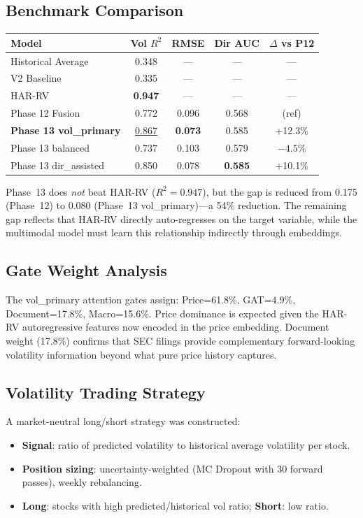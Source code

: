 \documentclass[12pt,a4paper]{article}
\begin{document}
\subsection{Benchmark Comparison}

\begin{center}
\begin{tabular}{lcccc}
\toprule
\textbf{Model} & \textbf{Vol $R^2$} & \textbf{RMSE} & \textbf{Dir AUC} & \textbf{$\Delta$ vs P12} \\
\midrule
Historical Average & 0.348 & --- & --- & --- \\
V2 Baseline        & 0.335 & --- & --- & --- \\
HAR-RV             & \textbf{0.947} & --- & --- & --- \\
Phase 12 Fusion    & 0.772 & 0.096 & 0.568 & (ref) \\
\textbf{Phase 13 vol\_primary} & \underline{0.867} & \textbf{0.073} & 0.585 & +12.3\% \\
Phase 13 balanced  & 0.737 & 0.103 & 0.579 & $-4.5\%$ \\
Phase 13 dir\_assisted & 0.850 & 0.078 & \textbf{0.585} & +10.1\% \\
\bottomrule
\end{tabular}
\end{center}

Phase~13 does \emph{not} beat HAR-RV ($R^2=0.947$), but the gap is reduced from
0.175 (Phase~12) to 0.080 (Phase~13 vol\_primary)---a 54\% reduction.  The remaining
gap reflects that HAR-RV directly auto-regresses on the target variable, while the
multimodal model must learn this relationship indirectly through embeddings.

\subsection{Gate Weight Analysis}
The vol\_primary attention gates assign: Price=61.8\%, GAT=4.9\%, Document=17.8\%,
Macro=15.6\%.  Price dominance is expected given the HAR-RV autoregressive features
now encoded in the price embedding.  Document weight (17.8\%) confirms that SEC
filings provide complementary forward-looking volatility information beyond what
pure price history captures.

\subsection{Volatility Trading Strategy}
A market-neutral long/short strategy was constructed:
\begin{itemize}
    \item \textbf{Signal}: ratio of predicted volatility to historical average
          volatility per stock.
    \item \textbf{Position sizing}: uncertainty-weighted (MC Dropout with 30 forward
          passes), weekly rebalancing.
    \item \textbf{Long}: stocks with high predicted/historical vol ratio;
          \textbf{Short}: low ratio.
\end{itemize}
\end{document}
